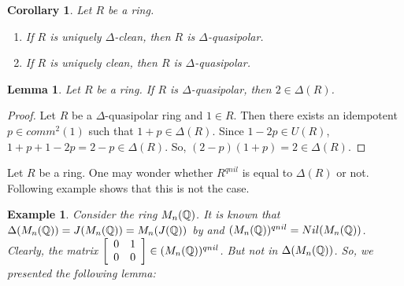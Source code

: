 \documentclass[12pt, reqno]{amsart}
\newtheorem{cor}[thm]{Corollary}
\newtheorem{lem}[thm]{Lemma}
\newtheorem{defn}[thm]{Definition}
\newtheorem{exam}[thm]{Example}
\numberwithin{equation}{section}
\begin{document}
\begin{cor}
    Let $R$ be a ring. 

    \begin{enumerate}
        \item If $R$ is uniquely $\Delta$-clean, then $R$ is $\Delta$-quasipolar.
        \item If $R$ is uniquely clean, then $R$ is $\Delta$-quasipolar.
    \end{enumerate}
\end{cor}











\begin{lem}\label{2}
    Let $R$ be a ring. If $R$ is $\Delta$-quasipolar, then $2\in \Delta(R)$.
\end{lem}

\begin{proof}
    Let $R$ be a $\Delta$-quasipolar ring and $1\in R$. Then there exists an idempotent $p\in comm^2(1)$ such that $1+p\in \Delta(R)$. Since $1-2p\in U(R)$, $1+p+1-2p=2-p\in \Delta(R)$. So, $(2-p)(1+p)=2\in \Delta(R)$.
\end{proof}


Let $R$ be a ring. One may wonder whether $R^{qnil}$ is equal to $\Delta(R)$ or not. Following example shows that this is not the case.

\begin{exam}
  {\rm Consider the ring $M_n(\Bbb{Q})$. It is known that $\Delta(M_n(\Bbb{Q})) = J(M_n(\Bbb{Q})) = M_n(J(\Bbb{Q}))$ by \cite{Leroy} and $(M_n(\Bbb{Q}))^{qnil}=Nil(M_n(\Bbb{Q}))$. Clearly, the matrix $\left[%
\begin{array}{cc}
  0 & 1 \\
  0 & 0 \\
\end{array}%
\right] \in (M_n(\Bbb{Q}))^{qnil}$. But not in $\Delta(M_n(\Bbb{Q}))$. So, we presented the following lemma:}
\end{exam}
\end{document}
